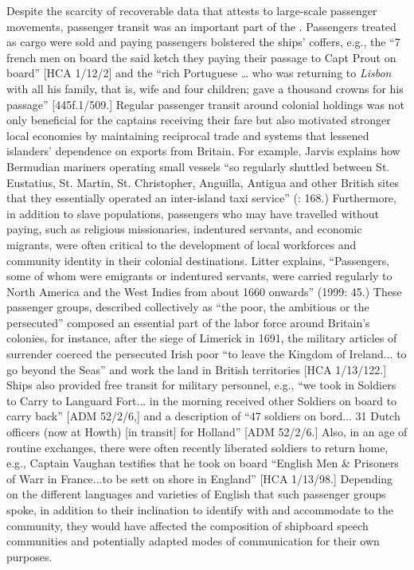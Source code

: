 Despite the scarcity of recoverable data that attests to large-scale passenger movements, passenger transit was an important part of the . Passengers treated as cargo were sold and paying passengers bolstered the ships’ coffers, e.g., the “7 french men on board the said ketch they paying their passage to Capt Prout on board” [HCA 1/12/2] and the “rich Portuguese … who was returning to \textit{Lisbon} with all his family, that is, wife and four children; gave a thousand crowns for his passage” [445f.1/509.] Regular passenger transit around colonial holdings was not only beneficial for the captains receiving their fare but also motivated stronger local economies by maintaining reciprocal trade and  systems that lessened islanders’ dependence on exports from Britain. For example, Jarvis explains how Bermudian mariners operating small vessels “so regularly shuttled between St. Eustatius, St. Martin, St. Christopher, Anguilla, Antigua and other British sites that they essentially operated an inter-island taxi service” (\citealt{Jarvis2010}: 168.) Furthermore, in addition to slave populations, passengers who may have travelled without paying, such as religious missionaries, indentured servants, and economic migrants, were often critical to the development of local workforces and community identity in their colonial destinations. Litter explains, “Passengers, some of whom were emigrants or indentured servants, were carried regularly to North America and the West Indies from about 1660 onwards” (1999: 45.) These passenger groups, described collectively as “the poor, the ambitious or the persecuted” \citep[45]{Litter1999} composed an essential part of the labor force around Britain's colonies, for instance, after the siege of Limerick in 1691, the military articles of surrender coerced the persecuted Irish poor “to leave the Kingdom of Ireland... to go beyond the Seas” and work the land in British territories [HCA 1/13/122.] Ships also provided free transit for military personnel, e.g., “we took in Soldiers to Carry to Languard Fort... in the morning received other Soldiers on board to carry back” [ADM 52/2/6,] and a description of “47 soldiers on bord... 31 Dutch officers (now at Howth) [in transit] for Holland” [ADM 52/2/6.] Also, in an age of routine  exchanges, there were often recently liberated soldiers to return home, e.g., Captain Vaughan testifies that he took on board “English Men \& Prisoners of Warr in France...to be sett on shore in England” [HCA 1/13/98.] Depending on the different languages and varieties of English that such passenger groups spoke, in addition to their inclination to identify with and accommodate to the  community, they would have affected the composition of shipboard speech communities and potentially adapted modes of communication for their own purposes. 

